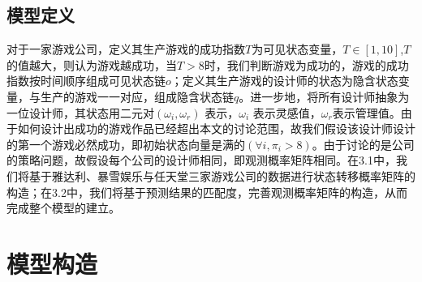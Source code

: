 \documentclass[hyperref]{ctexart}
\begin{document}
\begin{multicols}{2}
    \subsection{模型定义}
    对于一家游戏公司，定义其生产游戏的成功指数$T$为可见状态变量，$T \in [1,10]$,$T$的值越大，则认为游戏越成功，当$T > 8$时，我们判断游戏为成功的，游戏的成功指数按时间顺序组成可见状态链$o$；定义其生产游戏的设计师的状态为隐含状态变量，与生产的游戏一一对应，组成隐含状态链$q$。进一步地，将所有设计师抽象为一位设计师，其状态用二元对$(\omega_i, \omega_r)$  表示，$\omega_i$  表示灵感值，$\omega_r$表示管理值。由于如何设计出成功的游戏作品已经超出本文的讨论范围，故我们假设该设计师设计的第一个游戏必然成功，即初始状态向量是满的$(\forall i, \pi_i > 8)$。由于讨论的是公司的策略问题，故假设每个公司的设计师相同，即观测概率矩阵相同。在3.1中，我们将基于雅达利、暴雪娱乐与任天堂三家游戏公司的数据进行状态转移概率矩阵的构造；在3.2中，我们将基于预测结果的匹配度，完善观测概率矩阵的构造，从而完成整个模型的建立。
    
    
	\section{模型构造}

\end{multicols}
\end{document}
